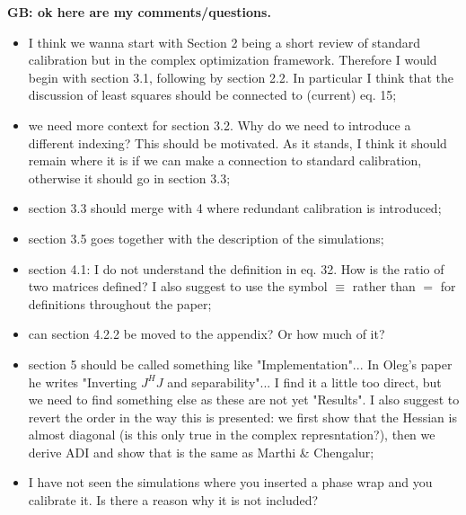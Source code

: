 \documentclass[useAMS,usenatbib]{mn2e}
\begin{document}
{\bf GB: ok here are my comments/questions.
\begin{itemize}
\item I think we wanna start with Section 2 being a short review of standard calibration but in the complex optimization framework. Therefore I would begin with section 3.1, following by section 2.2. In particular I think that the discussion of least squares should be connected to (current) eq. 15;
\item we need more context for section 3.2. Why do we need to introduce a different indexing? This should be motivated. As it stands, I think it should remain where it is if we can make a connection to standard calibration, otherwise it should go in section 3.3;
\item section 3.3 should merge with 4 where redundant calibration is introduced;
\item section 3.5 goes together with the description of the simulations;
\item section 4.1: I do not understand the definition in eq. 32. How is the ratio of two matrices defined? I also suggest to use the symbol $\equiv$ rather than $=$ for definitions throughout the paper;
\item can section 4.2.2 be moved to the appendix? Or how much of it?
\item section 5 should be called something like "Implementation"... In Oleg's paper he writes "Inverting $J^H J$ and separability"... I find it a little too direct, but we need to find something else as these are not yet "Results". I also suggest to revert the order in the way this is presented: we first show that the Hessian is almost diagonal (is this only true in the complex represntation?), then we derive ADI and show that is the same as Marthi \& Chengalur;
\item I have not seen the simulations where you inserted a phase wrap and you calibrate it. Is there a reason why it is not included?
\end{itemize}
}
\end{document}
